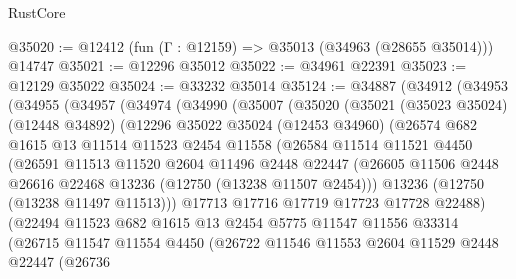 \begin{lexlean}{RustCore}
\begin{coremodule}
@35020 := @12412 (fun (Γ : @12159) => @35013 (@34963 (@28655 @35014))) @14747
@35021 := @12296 @35012
@35022 := @34961 @22391
@35023 := @12129 @35022
@35024 := @33232 @35014
@35124 := @34887
    (@34912
      (@34953
        (@34955
          (@34957
            (@34974
              (@34990
                (@35007
                  (@35020
                    (@35021
                      (@35023 @35024)
                      (@12448 @34892)
                      (@12296
                        @35022
                        @35024
                        (@12453 @34960)
                        (@26574
                          @682
                          @1615
                          @13
                          @11514
                          @11523
                          @2454
                          @11558
                          (@26584
                            @11514
                            @11521
                            @4450
                            (@26591
                              @11513
                              @11520
                              @2604
                              @11496
                              @2448
                              @22447
                              (@26605
                                @11506
                                @2448
                                @26616
                                @22468
                                @13236
                                (@12750 (@13238 @11507 @2454)))
                              @13236
                              (@12750 (@13238 @11497 @11513)))
                            @17713
                            @17716
                            @17719
                            @17723
                            @17728
                            @22488)
                          (@22494
                            @11523
                            @682
                            @1615
                            @13
                            @2454
                            @5775
                            @11547
                            @11556
                            @33314
                            (@26715
                              @11547
                              @11554
                              @4450
                              (@26722
                                @11546
                                @11553
                                @2604
                                @11529
                                @2448
                                @22447
                                (@26736

\end{coremodule}
\end{lexlean}
